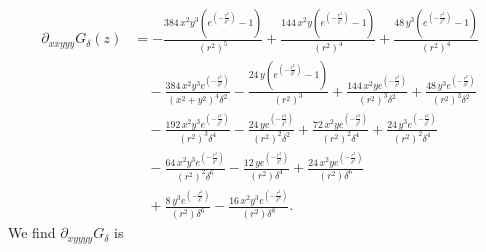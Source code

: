 \documentclass[12pt]{amsart}
\begin{document}
\begin{align*}
  \partial_{xxyyy}G_\delta(z) &= 
  - \frac{384 \, x^{2} y^{3} {\left(e^{\left(-\frac{r^{2}}{\delta^{2}}\right)} - 1\right)}}{{\left(r^{2}\right)}^{5}} 
  + \frac{144 \, x^{2} y {\left(e^{\left(-\frac{r^{2}}{\delta^{2}}\right)} - 1\right)}}{{\left(r^{2}\right)}^{4}} 
  + \frac{48 \, y^{3} {\left(e^{\left(-\frac{r^{2}}{\delta^{2}}\right)} - 1\right)}}{{\left(r^{2}\right)}^{4}} \\
  &\quad - \frac{384 \, x^{2} y^{3} e^{\left(-\frac{r^{2}}{\delta^{2}}\right)}}{{\left(x^{2} + y^{2}\right)}^{4} \delta^{2}} 
  - \frac{24 \, y {\left(e^{\left(-\frac{r^{2}}{\delta^{2}}\right)} - 1\right)}}{{\left(r^{2}\right)}^{3}} 
  + \frac{144 \, x^{2} y e^{\left(-\frac{r^{2}}{\delta^{2}}\right)}}{{\left(r^{2}\right)}^{3} \delta^{2}} 
  + \frac{48 \, y^{3} e^{\left(-\frac{r^{2}}{\delta^{2}}\right)}}{{\left(r^{2}\right)}^{3} \delta^{2}} \\
  &\quad - \frac{192 \, x^{2} y^{3} e^{\left(-\frac{r^{2}}{\delta^{2}}\right)}}{{\left(r^{2}\right)}^{3} \delta^{4}} 
  - \frac{24 \, y e^{\left(-\frac{r^{2}}{\delta^{2}}\right)}}{{\left(r^{2}\right)}^{2} \delta^{2}} 
  + \frac{72 \, x^{2} y e^{\left(-\frac{r^{2}}{\delta^{2}}\right)}}{{\left(r^{2}\right)}^{2} \delta^{4}} 
  + \frac{24 \, y^{3} e^{\left(-\frac{r^{2}}{\delta^{2}}\right)}}{{\left(r^{2}\right)}^{2} \delta^{4}} \\
  &\quad - \frac{64 \, x^{2} y^{3} e^{\left(-\frac{r^{2}}{\delta^{2}}\right)}}{{\left(r^{2}\right)}^{2} \delta^{6}} 
  - \frac{12 \, y e^{\left(-\frac{r^{2}}{\delta^{2}}\right)}}{{\left(r^{2}\right)} \delta^{4}} 
  + \frac{24 \, x^{2} y e^{\left(-\frac{r^{2}}{\delta^{2}}\right)}}{{\left(r^{2}\right)} \delta^{6}} \\
  &\quad + \frac{8 \, y^{3} e^{\left(-\frac{r^{2}}{\delta^{2}}\right)}}{{\left(r^{2}\right)} \delta^{6}} 
  - \frac{16 \, x^{2} y^{3} e^{\left(-\frac{r^{2}}{\delta^{2}}\right)}}{{\left(r^{2}\right)} \delta^{8}}.
\end{align*}
We find $\partial_{xyyyy}G_\delta$ is
\end{document}
